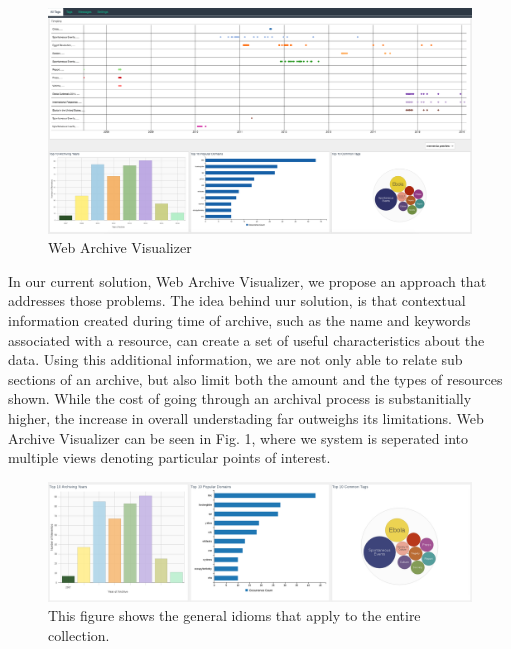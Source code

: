 \documentclass[10pt,journal,compsoc]{IEEEtran}
\begin{document}
\begin{figure}[t]
\centering
\includegraphics[scale=0.1]{Figure1}
\caption{Web Archive Visualizer}
\label{fig:mesh1}
\end{figure}

In our current solution, Web Archive Visualizer, we propose an approach that addresses those problems. The idea behind uur solution, is that contextual information created during time of archive, such as the name and keywords associated with a resource, can create a set of useful characteristics about the data. Using this additional information, we are not only able to relate sub sections of an archive, but also limit both the amount and the types of resources shown. While the cost of going through an archival process is substanitially higher, the increase in overall understading far outweighs its limitations. Web Archive Visualizer can be seen in Fig. 1, where we system is seperated into multiple views denoting particular points of interest. \par

\begin{figure}
\centering
\includegraphics[width=\textwidth]{Figure3a}
\caption{This figure shows the general idioms that apply to the entire collection.}
\label{fig:mesh2}
\end{figure}
\end{document}
